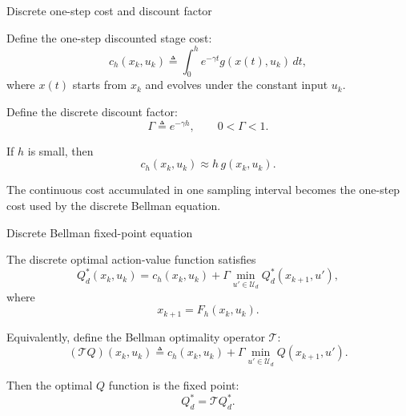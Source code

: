\documentclass[aspectratio=169]{beamer}
\begin{document}
\begin{frame}{Discrete one-step cost and discount factor}

Define the one-step discounted stage cost:
\[
c_h(x_k,u_k)
\triangleq
\int_0^h
e^{-\gamma t}g(x(t),u_k)\,dt,
\]
where \(x(t)\) starts from \(x_k\) and evolves under the constant input \(u_k\).

\vspace{0.2cm}

Define the discrete discount factor:
\[
\Gamma
\triangleq
e^{-\gamma h},
\qquad
0<\Gamma<1.
\]

\vspace{0.2cm}

If \(h\) is small, then
\[
c_h(x_k,u_k)
\approx
h\,g(x_k,u_k).
\]

\vspace{0.15cm}


The continuous cost accumulated in one sampling interval becomes the one-step cost used by the discrete Bellman equation.


\end{frame}


\begin{frame}{Discrete Bellman fixed-point equation}

The discrete optimal action-value function satisfies
\[
Q_d^*(x_k,u_k)
=
c_h(x_k,u_k)
+
\Gamma
\min_{u'\in\mathcal U_d}
Q_d^*(x_{k+1},u'),
\]
where
\[
x_{k+1}=F_h(x_k,u_k).
\]

\vspace{0.2cm}

Equivalently, define the Bellman optimality operator \(\mathcal T\):
\[
(\mathcal TQ)(x_k,u_k)
\triangleq
c_h(x_k,u_k)
+
\Gamma
\min_{u'\in\mathcal U_d}
Q(x_{k+1},u').
\]

\vspace{0.15cm}

Then the optimal \(Q\) function is the fixed point:
\[
Q_d^*=\mathcal T Q_d^*.
\]

\end{frame}
\end{document}
